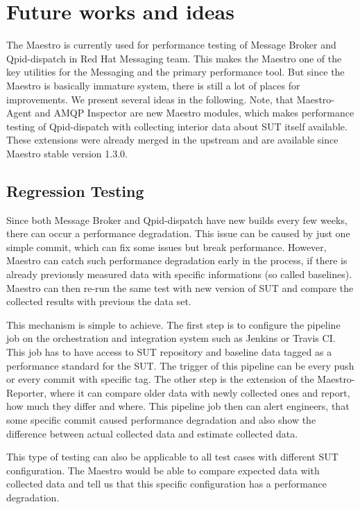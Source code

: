 
\chapter{Future works and ideas}
\label{Future works and ideas}
The Maestro is currently used for performance testing of Message Broker and Qpid-dispatch in Red Hat Messaging team. This makes the Maestro one of the key utilities for the Messaging and the primary performance tool. But since the Maestro is basically immature system, there is still a lot of places for improvements. We present several ideas in the following. Note, that Maestro-Agent and AMQP Inspector are new Maestro modules, which makes performance testing of Qpid-dispatch with collecting interior data about SUT itself available. These extensions were already merged in the upstream and are available since Maestro stable version 1.3.0.

\section{Regression Testing}
Since both Message Broker and Qpid-dispatch have new builds every few weeks, there can occur a performance degradation. This issue can be caused by just one simple commit, which can fix some issues but break performance. However, Maestro can catch such performance degradation early in the process, if there is already previously measured data with specific informations (so called baselines). Maestro can then re-run the same test with new version of SUT and compare the collected results with previous the data set.

This mechanism is simple to achieve. The first step is to configure the pipeline job on the orchestration and integration system such as Jenkins or Travis CI. This job has to have access to SUT repository and baseline data tagged as a performance standard for the SUT. The trigger of this pipeline can be every push or every commit with specific tag. The other step is the extension of the Maestro-Reporter, where it can compare older data with newly collected ones and report, how much they differ and where. This pipeline job then can alert engineers, that some specific commit caused performance degradation and also show the difference between actual collected data and estimate collected data.

This type of testing can also be applicable to all test cases with different SUT configuration. The Maestro would be able to compare expected data with collected data and tell us that this specific configuration has a performance degradation.

